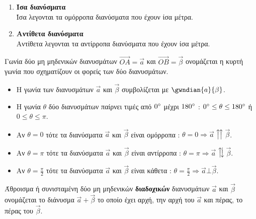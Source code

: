 \documentclass[twoside,nofonts,internet,shmeiwseis]{thewria}
\begin{document}
\vspace{-5mm}
\begin{enumerate}[itemsep=0mm]
\item \textbf{Ίσα διανύσματα}\\
Ίσα λεγονται τα ομόρροπα διανύσματα που έχουν ίσα μέτρα.
\item \textbf{Αντίθετα διανύσματα}\\
Αντίθετα λεγονται τα αντίρροπα διανύσματα που έχουν ίσα μέτρα.
\end{enumerate}
Γωνία δύο μη μηδενικών διανυσμάτων $ \overrightarrow{OA}=\vec{a} $ και $ \overrightarrow{OB}=\vec{\beta} $ ονομάζεται η κυρτή γωνία που σχηματίζουν οι φορείς των δύο διανυσμάτων.
\begin{itemize}[itemsep=0mm]
\item Η γωνία των διανυσμάτων $ \vec{a} $ και $ \vec{\beta} $ συμβολίζεται με $ \gwndian{a}{\beta} $.
\item Η γωνία $ \theta $ δύο διανυσμάτων παίρνει τιμές από $ 0\degree $ μέχρι $ 180\degree $ : $ 0\degree\leq\theta\leq 180\degree $ ή $ 0\leq\theta\leq \pi $.
\item Αν $ \theta=0 $ τότε τα διανύσματα $ \vec{a} $ και $ \vec{\beta} $ είναι ομόρροπα : $ \theta=0\Rightarrow \vec{a}\upuparrows \vec{\beta} $.
\item Αν $ \theta=\pi $ τότε τα διανύσματα $ \vec{a} $ και $ \vec{\beta} $ είναι αντίρροπα : $ \theta=\pi\Rightarrow \vec{a}\updownarrows \vec{\beta} $.
\item Αν $ \theta=\frac{\pi}{2} $ τότε τα διανύσματα $ \vec{a} $ και $ \vec{\beta} $ είναι κάθετα : $ \theta=\frac{\pi}{2}\Rightarrow \vec{a}\bot \vec{\beta} $.
\end{itemize}
Άθροισμα ή συνισταμένη δύο μη μηδενικών \textbf{διαδοχικών}  διανυσμάτων $ \vec{a} $ και $ \vec{\beta} $ ονομάζεται το διάνυσμα $ \vec{a}+\vec{\beta} $ το οποίο έχει αρχή, την αρχή του $ \vec{a} $ και πέρας, το πέρας του $ \vec{\beta} $.
\begin{center}
\end{center}
\end{document}
